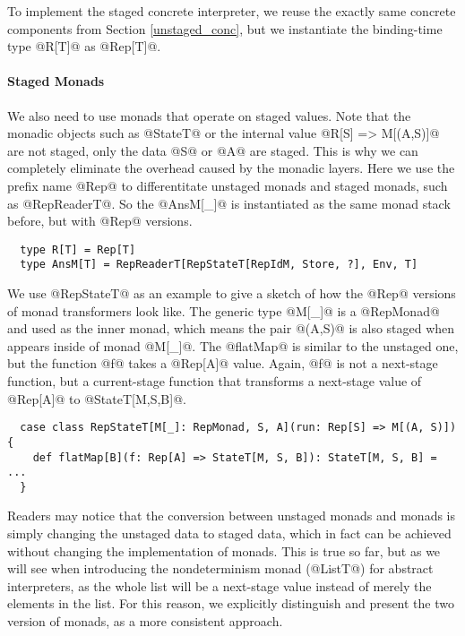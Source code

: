 To implement the staged concrete interpreter, we reuse the exactly same concrete
components from Section \ref{unstaged_conc}, but we instantiate the binding-time
type @R[T]@ as @Rep[T]@.

\paragraph{Staged Monads} We also need to use monads that operate on staged
values. Note that the monadic objects such as @StateT@ or the internal value
@R[S] => M[(A,S)]@ are not staged, only the data @S@ or @A@ are staged.
This is why we can completely eliminate the overhead caused by the monadic layers.
Here we use the prefix name @Rep@ to differentitate unstaged monads and staged
monads, such as @RepReaderT@. So the @AnsM[_]@ is instantiated as the same monad
stack before, but with @Rep@ versions.

\begin{lstlisting}
  type R[T] = Rep[T]
  type AnsM[T] = RepReaderT[RepStateT[RepIdM, Store, ?], Env, T]
\end{lstlisting}

We use @RepStateT@ as an example to give a sketch of how the @Rep@ versions of monad
transformers look like. The generic type @M[_]@ is a @RepMonad@ and used as the
inner monad, which means the pair @(A,S)@ is also staged when appears inside of monad
@M[_]@. The @flatMap@ is similar to the unstaged one, but the function @f@ takes
a @Rep[A]@ value. Again, @f@ is not a next-stage function, but a current-stage
function that transforms a next-stage value of @Rep[A]@ to @StateT[M,S,B]@.

\begin{lstlisting}
  case class RepStateT[M[_]: RepMonad, S, A](run: Rep[S] => M[(A, S)]) {
    def flatMap[B](f: Rep[A] => StateT[M, S, B]): StateT[M, S, B] = ...
  }
\end{lstlisting}

Readers may notice that the conversion between unstaged monads and monads is 
simply changing the unstaged data to staged data, which in fact can be achieved without
changing the implementation of monads. This is true so far, but as we will see
when introducing the nondeterminism monad (@ListT@) for abstract interpreters, as
the whole list will be a next-stage value instead of merely the elements in the list.
For this reason, we explicitly distinguish and present the two version of
monads, as a more consistent approach.

